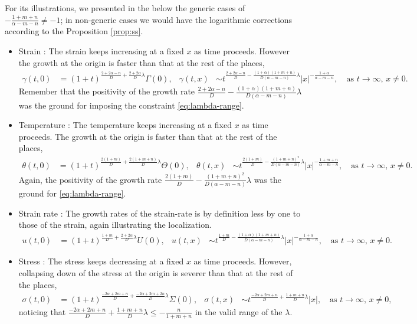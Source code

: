 \documentclass[a4paper,11pt]{article}
\theoremstyle{remark}
\begin{document}
For its illustrations, we presented in the below the generic cases of $-\frac{1+m+n}{\alpha-m-n}\ne-1$; in non-generic cases we would have the logarithmic corrections according to the Proposition \ref{prop:ss}.
\begin{itemize}
 \item Strain : The strain keeps increasing at a fixed $x$ as time proceeds. However the growth at the origin is faster than that at the rest of the places,
\begin{align*}
 \gamma(t,0) &= (1+t)^{\frac{2+2\alpha-n}{D} + \frac{2+2\alpha}{D}\lambda}\Gamma(0), &
 \gamma(t,x) &\sim t^{\frac{2+2\alpha-n}{D} - \frac{(1+\alpha)(1+m+n)}{D(\alpha-m-n)}\lambda}|x|^{-\frac{1+\alpha}{\alpha-m-n}}, \quad \text{as $t \rightarrow \infty$, $x\ne0$.}
\end{align*}
Remember that the positivity of the growth rate $\frac{2+2\alpha-n}{D} - \frac{(1+\alpha)(1+m+n)}{D(\alpha-m-n)}\lambda$ was the ground for imposing the constraint \eqref{eq:lambda-range}.
\item Temperature : The temperature keeps increasing at a fixed $x$ as time proceeds. The growth at the origin is faster than that at the rest of the places,
\begin{align*}
 \theta(t,0) &= (1+t)^{\frac{2(1+m)}{D} + \frac{2(1+m+n)}{D}\lambda}\Theta(0),&
 \theta(t,x) &\sim t^{\frac{2(1+m)}{D} - \frac{(1+m+n)^2}{D(\alpha-m-n)}\lambda}|x|^{-\frac{1+m+n}{\alpha-m-n}}, \quad \text{as $t \rightarrow \infty$, $x\ne0$.}
\end{align*}
Again, the positivity of the growth rate $\frac{2(1+m)}{D} - \frac{(1+m+n)^2}{D(\alpha-m-n)}\lambda$ was the ground for \eqref{eq:lambda-range}.
\item Strain rate : The growth rates of the strain-rate is by definition less by one to those of the strain, again illustrating the localization.
\begin{align*}
 u(t,0) &= (1+t)^{\frac{1+m}{D} + \frac{2+2\alpha}{D}\lambda}U(0),&
 u(t,x) &\sim t^{\frac{1+m}{D} - \frac{(1+\alpha)(1+m+n)}{D(\alpha-m-n)}\lambda}|x|^{-\frac{1+\alpha}{\alpha-m-n}}, \quad \text{as $t \rightarrow \infty$, $x\ne0$.}
\end{align*}
\item Stress : The stress keeps decreasing at a fixed $x$ as time proceeds. However, collapsing down of the stress at the origin is severer than that at the rest of the places,
\begin{align*}
 \sigma(t,0) &= (1+t)^{\frac{-2\alpha+2m+n}{D} + \frac{-2\alpha+2m+2n}{D}\lambda}\Sigma(0), &
 \sigma(t,x) &\sim t^{\frac{-2\alpha+2m+n}{D} +\frac{1+m+n}{D}\lambda}|x|, \quad \text{as $t \rightarrow \infty$, $x\ne0$,}
\end{align*}
noticing that $\frac{-2\alpha+2m+n}{D} +\frac{1+m+n}{D}\lambda\le-\frac{n}{1+m+n}$ in the valid range of the $\lambda$.



\end{itemize}
\end{document}
